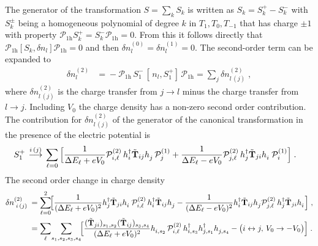 The generator of the transformation $S=\sum_k S_k$ is written as $S_k=S_k^+-S_k^-$ with $S_k^{\pm}$ being a homogeneous polynomial of degree $k$ in $T_{1},T_0,T_{-1}$ that has charge $\pm 1$ with property $\mathcal{P}_{1\text{h}}S_k^+ = S_k^-\mathcal{P}_{1\text{h}} =0$. From this it follows directly that $\mathcal{P}_{1\text{h}} [S_k, \delta {n}_l ] \mathcal{P}_{1\text{h}} = 0$ and then $\delta n_l^{(0)}=\delta n_l^{(1)}=0$.
The second-order term can be expanded to
    \begin{equation}
\begin{split}
    \delta n_l^{(2)}
    \!&=\!  - \mathcal{P}_{1\text{h}} \, S_1^{-} \, [ \, {n}_l, S_1^{+} ]\,  \mathcal{P}_{1\text{h}} = \sum_{j} \delta n_{l \,(j)}^{(2)} \; ,
\end{split}
\end{equation} where %
$\delta n_{l \,(j)}^{(2)}$  is the charge transfer from $j\to l$ minus the charge transfer from $l \to j$.
Including $V_0$ the charge density has a non-zero second order contribution.
The contribution for $\delta n_{l \,(j)}^{(2)}$ of the generator of the canonical transformation in the presence of the electric potential is
\begin{align}
    S_1^{+}  &\overset{\;i \,(j)\;}{\longrightarrow}  \sum_{\ell=0} \Big[ \frac{1}{\Delta E_{\ell}+eV_0} \mathcal{P}^{(2)}_{i,\ell} \, h_i^\dagger  \tilde{\bf{T}}_{ij} h_j^{\phantom{\dagger}} \, \mathcal{P}^{(1)}_{j}  + \frac{1}{\Delta E_{\ell}-eV_0} \mathcal{P}^{(2)}_{j,\ell} \, h_j^\dagger  \tilde{\bf{T}}_{ji} h_i^{\phantom{\dagger}} \, \mathcal{P}^{(1)}_{i} \Big] \; .
\end{align}
The second order change in  charge density
\begin{align}
     \delta n_{\;i \,(j)\;}^{(2)}   &= \sum_{\ell=0}^{2}\!\! \Big[ \frac{1}{(\Delta E_{\ell}+eV_0)^2}  h_j^\dagger  \tilde{\bf{T}}_{ji} h_i^{\phantom{\dagger}}\, \mathcal{P}^{(2)}_{i,\ell} \, h_i^\dagger  \tilde{\bf{T}}_{ij} h_j^{\phantom{\dagger}}- \frac{1}{(\Delta E_{\ell}-eV_0)^2} h_i^\dagger  \tilde{\bf{T}}_{ij} h_j^{\phantom{\dagger}} \mathcal{P}^{(2)}_{j,\ell} \, h_j^\dagger  \tilde{\bf{T}}_{ji} h_i^{\phantom{\dagger}}   \Big] \; , \\
     &= \sum_{\ell}\! \sum_{s_1, s_2, s_3,s_4}\!\! \Big[ \frac{ (\tilde{\bf{T}}_{ji})_{s_1,s_2}(\tilde{\bf{T}}_{ij})_{s_3,s_4}  }{(\Delta E_{\ell}+eV_0)^2}    h_{i,s_2}^{\phantom{\dagger}}\, \mathcal{P}^{(2)}_{i,\ell} \, h_{i,s_3}^\dagger
 h_{j,s_1}^\dagger h_{j,s_4}^{\phantom{\dagger}}- \big( i\leftrightarrow j,\, V_0\to-V_0\big) \Big] \; .
\end{align}
